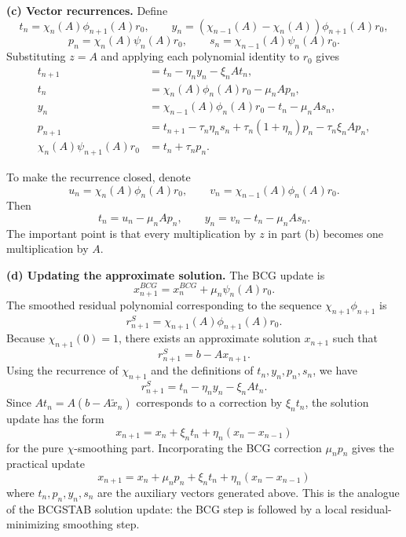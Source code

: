 \documentclass{ctexart}
\begin{document}
\begin{solution}
  \medskip
  \noindent\textbf{(c) Vector recurrences.}
  Define
  \[
    t_n=\chi_n(A)\phi_{n+1}(A)r_0,
    \qquad
    y_n=(\chi_{n-1}(A)-\chi_n(A))\phi_{n+1}(A)r_0,
  \]
  \[
    p_n=\chi_n(A)\psi_n(A)r_0,
    \qquad
    s_n=\chi_{n-1}(A)\psi_n(A)r_0.
  \]
  Substituting $z=A$ and applying each polynomial identity to $r_0$ gives
  \begin{equation}
    \begin{aligned}
      t_{n+1}
      &=t_n-\eta_n y_n-\xi_n A t_n,\\
      t_n
      &=\chi_n(A)\phi_n(A)r_0-\mu_n A p_n,\\
      y_n
      &=\chi_{n-1}(A)\phi_n(A)r_0-t_n-\mu_n A s_n,\\
      p_{n+1}
      &=t_{n+1}-\tau_n\eta_n s_n+\tau_n(1+\eta_n)p_n-\tau_n\xi_n A p_n,\\
      \chi_n(A)\psi_{n+1}(A)r_0
      &=t_n+\tau_n p_n.
    \end{aligned}
  \end{equation}

  To make the recurrence closed, denote
  \[
    u_n=\chi_n(A)\phi_n(A)r_0,
    \qquad
    v_n=\chi_{n-1}(A)\phi_n(A)r_0.
  \]
  Then
  \[
    t_n=u_n-\mu_nAp_n,
    \qquad
    y_n=v_n-t_n-\mu_nAs_n.
  \]
  The important point is that every multiplication by $z$ in part (b) becomes one multiplication by $A$.

  \medskip
  \noindent\textbf{(d) Updating the approximate solution.}
  The BCG update is
  \[
    x_{n+1}^{BCG}=x_n^{BCG}+\mu_n\psi_n(A)r_0.
  \]
  The smoothed residual polynomial corresponding to the sequence $\chi_{n+1}\phi_{n+1}$ is
  \[
    r_{n+1}^{S}=\chi_{n+1}(A)\phi_{n+1}(A)r_0.
  \]
  Because $\chi_{n+1}(0)=1$, there exists an approximate solution $x_{n+1}$ such that
  \[
    r_{n+1}^{S}=b-Ax_{n+1}.
  \]
  Using the recurrence of $\chi_{n+1}$ and the definitions of $t_n,y_n,p_n,s_n$, we have
  \[
    r_{n+1}^{S}=t_n-\eta_n y_n-\xi_nAt_n.
  \]
  Since $At_n=A(b-A\tilde x_n)$ corresponds to a correction by $\xi_n t_n$, the solution update has the form
  \[
    \boxed{
      x_{n+1}=x_n+\xi_n t_n+\eta_n(x_n-x_{n-1})
    }
  \]
  for the pure $\chi$-smoothing part.  Incorporating the BCG correction $\mu_n p_n$ gives the practical update
  \[
    \boxed{
      x_{n+1}=x_n+\mu_n p_n+\xi_n t_n+\eta_n(x_n-x_{n-1})
    }
  \]
  where $t_n,p_n,y_n,s_n$ are the auxiliary vectors generated above.  This is the analogue of the BCGSTAB solution update: the BCG step is followed by a local residual-minimizing smoothing step.


\end{solution}
\end{document}
